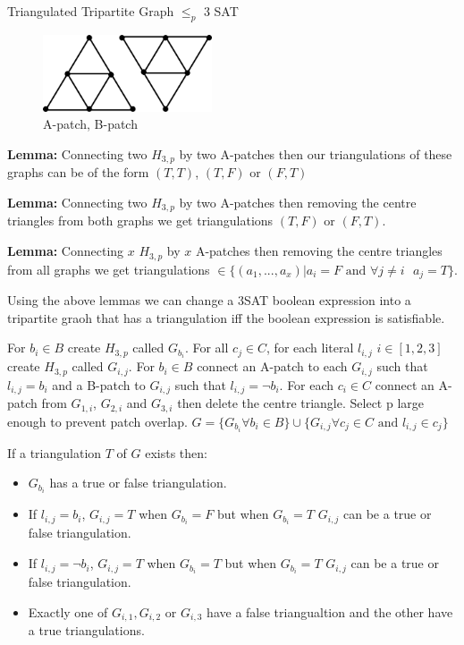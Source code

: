 \documentclass[final]{beamer}
\newlength{\colwidth}
\newcounter{col}
\begin{document}
\begin{frame}[t]
\begin{columns}[t]
\begin{column}{\colwidth}
\begin{block}{Triangulated Tripartite Graph $\leq_p$ 3 SAT}
\begin{figure}
		\includegraphics[width=50mm]{patches.png}
		\caption{A-patch, B-patch}
\end{figure}

\textbf{Lemma:} Connecting two $H_{3,p}$ by two A-patches then our triangulations of these graphs can be of the form $(T,T)$, $(T,F)$ or $(F,T)$

\textbf{Lemma:} Connecting two $H_{3,p}$ by two A-patches then removing the centre triangles from both graphs we get triangulations $(T,F)$ or $(F,T)$.

\textbf{Lemma:} Connecting $x$ $H_{3,p}$ by $x$ A-patches then removing the centre triangles from all graphs we get triangulations $\in \{(a_1,...,a_x)| a_i=F\text{ and } \forall j\neq i\text{ } a_j=T \}$.

Using the above lemmas we can change a 3SAT boolean expression into a tripartite graoh that has a triangulation iff the boolean expression is satisfiable.

For $b_i\in B$ create $H_{3,p}$ called $G_{b_i}$. For all $c_j\in C$, for each literal $l_{i,j}$ $i\in [1,2,3]$  create $H_{3,p}$ called $G_{i,j}$. For $b_i \in B$ connect an A-patch to each $G_{i,j}$ such that $l_{i,j}=b_i$ and a B-patch to $G_{i,j}$ such that $l_{i,j}=\neg b_i$. For each $c_i\in C$ connect an A-patch from $G_{1,i}$, $G_{2,i}$ and $G_{3,i}$ then delete the centre triangle. Select p large enough to prevent patch overlap. $G = \{G_{b_i} \forall b_i \in B\}\cup\{G_{i,j} \forall c_j\in C\text{ and }l_{i,j}\in c_j \}$

If a triangulation $T$ of $G$ exists then: 
\begin{itemize}
\item $G_{b_i}$ has a true or false triangulation. 
\item If $l_{i,j}=b_i$, $G_{i,j}= T$ when $G_{b_i}=F$ but when $G_{b_i}=T$ $G_{i,j}$ can be a true or false triangulation. 
\item If $l_{i,j}=\neg b_i$, $G_{i,j}= T$ when $G_{b_i}=T$ but when $G_{b_i}=T$ $G_{i,j}$ can be a true or false triangulation. 
\item Exactly one of $G_{i,1}, G_{i,2}$ or $G_{i,3}$ have a false triangualtion and the other have a true triangulations.
\end{itemize}


\end{block}
\end{column}
\end{columns}
\end{frame}
\end{document}
